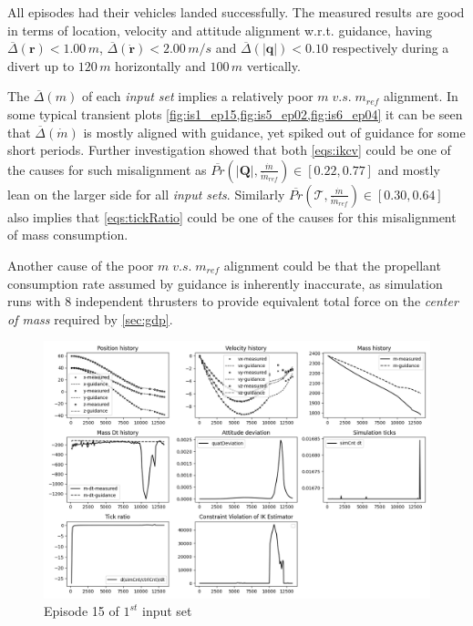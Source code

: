 \documentclass[10pt]{elsarticle}
\begin{document}
\begin{table}[htb]
\begin{tabular}{ L{0.6cm}  C{1.8cm}  L{1.3cm}  C{0.6cm}  C{0.6cm}  C{1.65cm}  C{1.65cm}  C{1.50cm} }
    & & & & & & & \\
    \hline 
\end{tabular}
\end{table}  

All episodes had their vehicles landed successfully. The measured results are good in terms of location, velocity and attitude alignment w.r.t. guidance, having $\overline{\Delta}(\boldsymbol{r}) < 1.00 \, m$, $\overline{\Delta}(\boldsymbol{\dot{r}}) < 2.00 \, m/s$ and $\overline{\Delta}(|\boldsymbol{q}|) < 0.10$ respectively during a divert up to $120 \, m$ horizontally and $100 \, m$ vertically.

The $\overline{\Delta}(m)$ of each \textit{input set} implies a relatively poor $m \; v.s. \; m_{ref}$ alignment. In some typical transient plots \cref{fig:is1_ep15,fig:is5_ep02,fig:is6_ep04} it can be seen that $\overline{\Delta}(\dot{m})$ is mostly aligned with guidance, yet spiked out of guidance for some short periods. Further investigation showed that both \cref{eqs:ikcv} could be one of the causes for such misalignment as $\overline{Pr}(|\boldsymbol{Q}|, \frac{\dot{m}}{\dot{m}_{ref}}) \in [0.22, 0.77]$ and mostly lean on the larger side for all \textit{input sets}. Similarly $\overline{Pr}(\mathcal{T}, \frac{\dot{m}}{\dot{m}_{ref}}) \in [0.30, 0.64]$ also implies that \cref{eqs:tickRatio} could be one of the causes for this misalignment of mass consumption. 

Another cause of the poor $m \; v.s. \; m_{ref}$ alignment could be that the propellant consumption rate assumed by guidance is inherently inaccurate, as simulation runs with 8 independent thrusters to provide equivalent total force on the \textit{center of mass} required by \cref{sec:gdp}.

\begin{figure}[!htb]   
   \begin{minipage}{0.95\textwidth}
     \centering
     \includegraphics[width=1.0\linewidth]{is1_ep15}
     \vspace*{2mm}
     \caption{Episode 15 of $1^{st}$ input set}
     \label{fig:is1_ep15}
   \end{minipage}
\end{figure}
\end{document}
